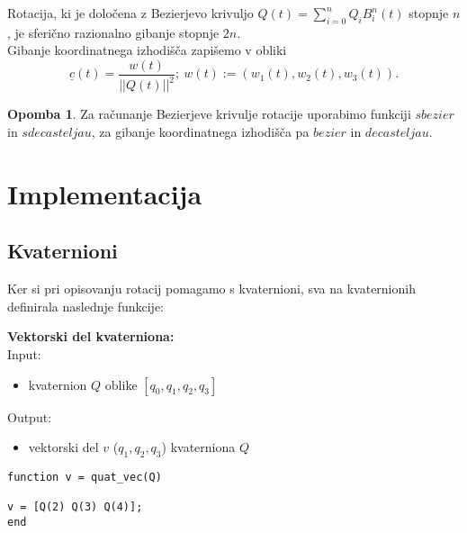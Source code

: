 \documentclass[12pt,a4paper,twoside]{article}
\theoremstyle{definition} %
\newtheorem{opomba}[definicija]{Opomba}
\theoremstyle{plain} %
\numberwithin{equation}{section}  %
\begin{document}
\noindent Rotacija, ki je določena z Bezierjevo krivuljo $Q(t) = \sum\limits_{i=0}^{n} Q_i B_i^n(t)$ stopnje $n$, je sferično razionalno gibanje stopnje $2n$. \\

\noindent Gibanje koordinatnega izhodišča zapišemo v obliki
$$\underline{c}(t) = \frac{w(t)}{||Q(t)||^2};~ w(t) := (w_1(t), w_2(t),w_3(t)).$$

\begin{opomba}
Za računanje Bezierjeve krivulje rotacije uporabimo funkciji $sbezier$ in $sdecasteljau$, za gibanje koordinatnega izhodišča pa $bezier$ in $decasteljau$.
\end{opomba}

\newpage

\section{Implementacija}

\subsection{Kvaternioni}
Ker si pri opisovanju rotacij pomagamo s kvaternioni, sva na kvaternionih definirala naslednje funkcije:

%

\vspace{1cm}
\textbf{Vektorski del kvaterniona:}\\
Input:
\begin{itemize}
\item kvaternion $Q$ oblike $[q_0,q_1,q_2,q_3]$
\end{itemize}
Output:
\begin{itemize}
\item vektorski del $v$ ($q_1,q_2,q_3$) kvaterniona $Q$
\end{itemize}

\begin{lstlisting}[caption = {quat\_vec}]
function v = quat_vec(Q)

v = [Q(2) Q(3) Q(4)];
end
\end{lstlisting}
\end{document}
